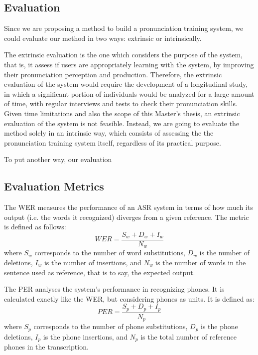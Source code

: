 \subsection{Evaluation}

Since we are proposing a method to build a pronunciation training system, we could
evaluate our method in two ways: extrinsic or intrinsically.

The extrinsic evaluation is the one which considers the purpose of the system, that is,
it assess if users are appropriately learning with the system, by improving their 
pronunciation perception and production. Therefore, the extrinsic evaluation of the
system would require the development of a longitudinal study, in which a significant 
portion of individuals would be analyzed for a large amount of time, with regular interviews
and tests to check their pronunciation skills. Given time limitations and also the scope
of this Master's thesis, an extrinsic evaluation of the system is not feasible. Instead, we 
are going to evaluate the method solely in an intrinsic way, which consists 
of assessing the the pronunciation training system itself, regardless of its practical purpose.

To put another way, our evaluation 

\subsection{Evaluation Metrics}

The \ac{WER} measures the performance of an \ac{ASR} system in terms of how
much its output (i.e. the words it recognized) diverges from a given reference. The metric
is defined as follows:
\begin{equation}
 \textit{WER}=\frac{S_w+D_w+I_w}{N_w}
\end{equation}
where $S_w$ corresponds to the number of word substitutions, $D_w$ is the number of deletions, 
$I_w$ is the number of insertions, and $N_w$ is the number of words in the sentence used
as reference, that is to say, the expected output.

The \ac{PER} analyses the system's performance in recognizing phones. It
is calculated exactly like the \ac{WER}, but considering phones as units. It is defined as:
\begin{equation}
 \textit{PER}=\frac{S_p+D_p+I_p}{N_p}
\end{equation}
where $S_p$ corresponds to the number of phone substitutions, $D_p$ is the phone deletions, 
$I_p$ is the phone insertions, and $N_p$ is the total number of reference phones in 
the transcription.

